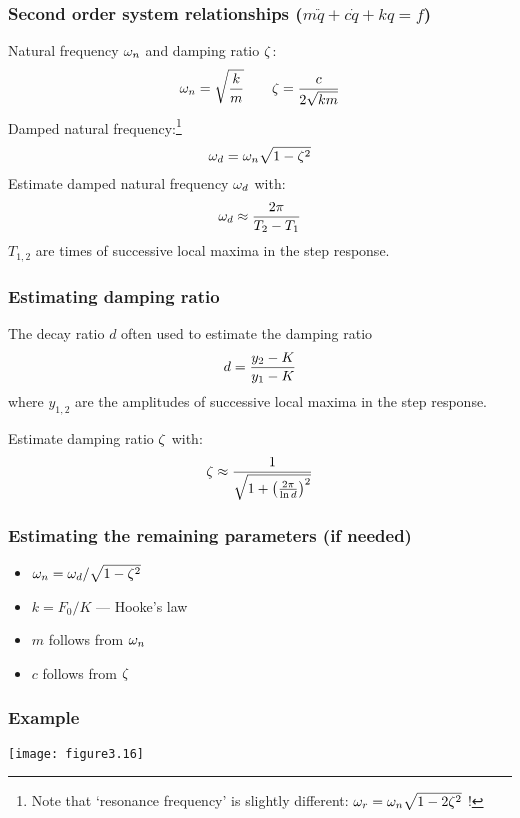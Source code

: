 \documentclass{beamer-control}
\begin{document}
\begin{frame}
\frametitle{Second order system relationships ($m\ddot q + c \dot q + kq = f$)}
Natural frequency $\omega_n$ and damping ratio $\zeta$:
\begin{gather}
\omega_n = \sqrt{\frac{k}{m}} \qquad \zeta = \frac{c}{2\sqrt{km}} 
\end{gather}
Damped natural frequency:\footnote{Note that `resonance frequency' is slightly different: $\omega_r=\omega_n\sqrt{1-2\zeta^2}$ !}
\begin{align}
\omega_d = \omega_n\sqrt{1-\zeta^2}
\end{align}
Estimate damped natural frequency $\omega_d$ with:
\begin{align}
\omega_d \approx \frac{2\pi}{T_2-T_1}
\end{align}
$T_{1,2}$ are times of successive local maxima in the step response.
\end{frame}

\begin{frame}
\frametitle{Estimating damping ratio}

The decay ratio $d$ often used to estimate the damping ratio
\begin{align}
d=\frac{y_2-K}{y_1-K}
\end{align}
where $y_{1,2}$ are the amplitudes of successive local maxima in the step response.
\bigskip

Estimate damping ratio $\zeta$ with:
\begin{align}
  \zeta \approx \frac{1}{\sqrt{1+\left(\frac{2\pi}{\ln d}\right)^2}}
\end{align}
\end{frame}

\begin{frame}
\frametitle{Estimating the remaining parameters (if needed)}
\begin{itemize}
\item
$\omega_n = \omega_d/\sqrt{1-\zeta^2} $
\item
$k = F_0/K$ --- Hooke's law
\item
$m$ follows from $\omega_n$
\item
$c$ follows from $\zeta$
\end{itemize}
\end{frame}

\begin{frame}
\frametitle{Example}
\texttt{[image: figure3.16]}

\end{frame}
\end{document}
